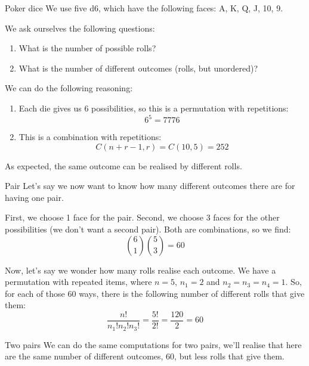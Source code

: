 \documentclass[a4paper]{article}
\begin{document}
\begin{parag}{Poker dice}
    We use five d6, which have the following faces: A, K, Q, J, 10, 9.

    We ask ourselves the following questions:
    \begin{enumerate}
        \item What is the number of possible rolls?
        \item What is the number of different outcomes (rolls, but unordered)?
    \end{enumerate}
    
    We can do the following reasoning:
    \begin{enumerate}
        \item Each die gives us 6 possibilities, so this is a permutation with repetitions:
        \[6^5 = 7776\]
        \item This is a combination with repetitions: 
            \[C\left(n + r - 1, r\right) = C\left(10, 5\right) = 252\]
    \end{enumerate}

    As expected, the same outcome can be realised by different rolls.

    \begin{subparag}{Pair}
        Let's say we now want to know how many different outcomes there are for having one pair. 

        First, we choose 1 face for the pair. Second, we choose 3 faces for the other possibilities (we don't want a second pair). Both are combinations, so we find: 
        \[\binom{6}{1} \binom{5}{3} = 60\]
        
        Now, let's say we wonder how many rolls realise each outcome. We have a permutation with repeated items, where $n = 5$, $n_1 = 2$ and $n_2 = n_3 = n_4 = 1$. So, for each of those 60 ways, there is the following number of different rolls that give them: 
        \[\frac{n!}{n_1!n_2!n_3!} = \frac{5!}{2!} = \frac{120}{2} = 60\]
        
    \end{subparag}

    \begin{subparag}{Two pairs}
        We can do the same computations for two pairs, we'll realise that here are the same number of different outcomes, 60, but less rolls that give them.
    \end{subparag}
\end{parag}
\end{document}
